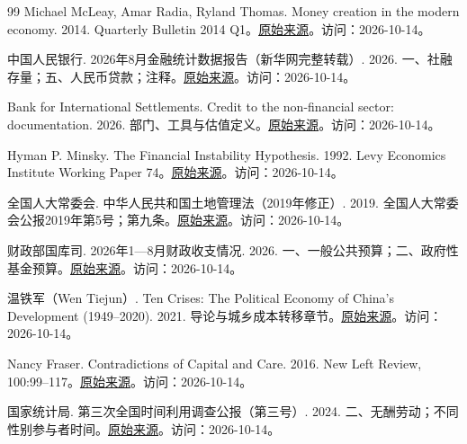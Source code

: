 \documentclass[UTF8,fontset=fandol,zihao=-4,oneside,openany]{ctexbook}
\begin{document}
\begin{thebibliography}{99}
 Michael McLeay, Amar Radia, Ryland Thomas. Money creation in the modern economy. 2014. Quarterly Bulletin 2014 Q1。\href{\detokenize{https://www.bankofengland.co.uk/quarterly-bulletin/2014/q1/money-creation-in-the-modern-economy}}{原始来源}。访问：2026-10-14。

 中国人民银行. 2026年8月金融统计数据报告（新华网完整转载）. 2026. 一、社融存量；五、人民币贷款；注释。\href{\detokenize{https://www3.xinhuanet.com/fortune/20260914/06447ad39fda407a8da93deb2a607b64/c.html}}{原始来源}。访问：2026-10-14。

 Bank for International Settlements. Credit to the non-financial sector: documentation. 2026. 部门、工具与估值定义。\href{\detokenize{https://www.bis.org/statistics/totcredit/credpriv_doc.pdf}}{原始来源}。访问：2026-10-14。

 Hyman P. Minsky. The Financial Instability Hypothesis. 1992. Levy Economics Institute Working Paper 74。\href{\detokenize{https://www.levyinstitute.org/publications/the-financial-instability-hypothesis/}}{原始来源}。访问：2026-10-14。

 全国人大常委会. 中华人民共和国土地管理法（2019年修正）. 2019. 全国人大常委会公报2019年第5号；第九条。\href{\detokenize{https://wb.flk.npc.gov.cn/flfg/PDF/2476cfe9607a43e4bab90d1b10624dbc.pdf}}{原始来源}。访问：2026-10-14。

 财政部国库司. 2026年1—8月财政收支情况. 2026. 一、一般公共预算；二、政府性基金预算。\href{\detokenize{https://gks.mof.gov.cn/tongjishuju/202609/t20260918_3997709.htm}}{原始来源}。访问：2026-10-14。

 温铁军（Wen Tiejun）. Ten Crises: The Political Economy of China’s Development (1949–2020). 2021. 导论与城乡成本转移章节。\href{\detokenize{https://link.springer.com/book/10.1007/978-981-16-0455-3}}{原始来源}。访问：2026-10-14。

 Nancy Fraser. Contradictions of Capital and Care. 2016. New Left Review, 100:99–117。\href{\detokenize{https://newleftreview.org/issues/ii100/articles/nancy-fraser-contradictions-of-capital-and-care}}{原始来源}。访问：2026-10-14。

 国家统计局. 第三次全国时间利用调查公报（第三号）. 2024. 二、无酬劳动；不同性别参与者时间。\href{\detokenize{https://www.stats.gov.cn/zt_18555/zthd/lhfw/2025/2025_qgsjlydc/202501/t20250127_1958534.html}}{原始来源}。访问：2026-10-14。


\end{thebibliography}
\end{document}
